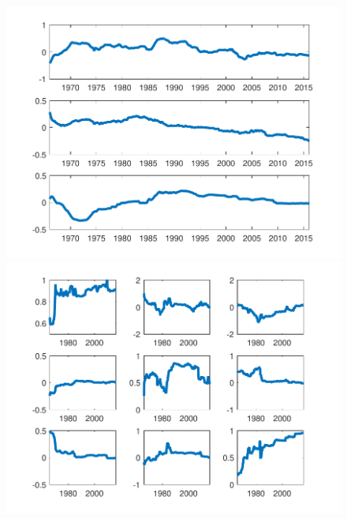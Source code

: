 \documentclass[12pt,reqno]{article}
\numberwithin{equation}{section}
\begin{document}
\begin{figure}[H]
\includegraphics[scale=0.6]{NKPC_optim_init_VAR1_alphas.pdf}
\includegraphics[scale=0.6]{NKPC_optim_init_VAR1_betas.pdf}


\end{figure}

\newpage
\end{document}
